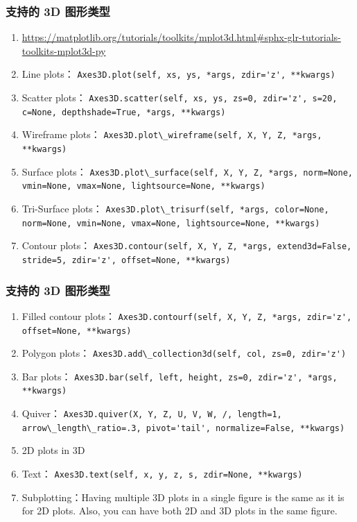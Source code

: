 \documentclass[UTF8,a4paper,12pt]{ctexart}  %
\providecommand{\tightlist}{\setlength{\itemsep}{0pt}\setlength{\parskip}{0pt}}
\newcommand{\passthrough}[1]{\lstset{mathescape=false}#1\lstset{mathescape=true}}
\begin{document}
\hypertarget{ux652fux6301ux7684-3d-ux56feux5f62ux7c7bux578b}{%
\subsubsection{支持的 3D 图形类型}\label{ux652fux6301ux7684-3d-ux56feux5f62ux7c7bux578b}}

\begin{enumerate}
\def\labelenumi{\arabic{enumi}.}
\tightlist
\item
  \url{https://matplotlib.org/tutorials/toolkits/mplot3d.html\#sphx-glr-tutorials-toolkits-mplot3d-py}
\item
  Line plots： \passthrough{\lstinline!Axes3D.plot(self, xs, ys, *args, zdir='z', **kwargs)!}
\item
  Scatter plots：
  \passthrough{\lstinline!Axes3D.scatter(self, xs, ys, zs=0, zdir='z', s=20, c=None, depthshade=True, *args, **kwargs)!}
\item
  Wireframe plots：
  \passthrough{\lstinline!Axes3D.plot\_wireframe(self, X, Y, Z, *args, **kwargs)!}
\item
  Surface plots：
  \passthrough{\lstinline!Axes3D.plot\_surface(self, X, Y, Z, *args, norm=None, vmin=None, vmax=None, lightsource=None, **kwargs)!}
\item
  Tri-Surface plots：
  \passthrough{\lstinline!Axes3D.plot\_trisurf(self, *args, color=None, norm=None, vmin=None, vmax=None, lightsource=None, **kwargs)!}
\item
  Contour plots：
  \passthrough{\lstinline!Axes3D.contour(self, X, Y, Z, *args, extend3d=False, stride=5, zdir='z', offset=None, **kwargs)!}
\end{enumerate}

\hypertarget{ux652fux6301ux7684-3d-ux56feux5f62ux7c7bux578b-1}{%
\subsubsection{支持的 3D 图形类型}\label{ux652fux6301ux7684-3d-ux56feux5f62ux7c7bux578b-1}}

\begin{enumerate}
\def\labelenumi{\arabic{enumi}.}
\tightlist
\item
  Filled contour plots：
  \passthrough{\lstinline!Axes3D.contourf(self, X, Y, Z, *args, zdir='z', offset=None, **kwargs)!}
\item
  Polygon plots： \passthrough{\lstinline!Axes3D.add\_collection3d(self, col, zs=0, zdir='z')!}
\item
  Bar plots：
  \passthrough{\lstinline!Axes3D.bar(self, left, height, zs=0, zdir='z', *args, **kwargs)!}
\item
  Quiver：
  \passthrough{\lstinline!Axes3D.quiver(X, Y, Z, U, V, W, /, length=1, arrow\_length\_ratio=.3, pivot='tail', normalize=False, **kwargs)!}
\item
  2D plots in 3D
\item
  Text： \passthrough{\lstinline!Axes3D.text(self, x, y, z, s, zdir=None, **kwargs)!}
\item
  Subplotting：Having multiple 3D plots in a single figure is the same
  as it is for 2D plots. Also, you can have both 2D and 3D plots in
  the same figure.
\end{enumerate}
\end{document}
